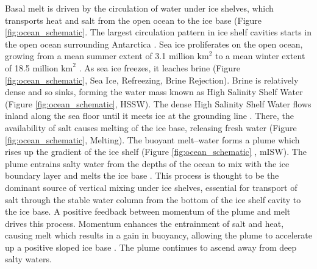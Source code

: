 Basal melt is driven by the circulation of water under ice shelves, which transports heat and salt from the open ocean to the ice base (Figure {\ref{fig:ocean_schematic}}. The largest circulation pattern in ice shelf cavities starts in the open ocean surrounding Antarctica \citep{jacobs1979circulation}. Sea ice proliferates on the open ocean, growing from a mean summer extent of 3.1 million $\mathrm{km}^2$ to a mean winter extent of 18.5 million $\mathrm{km}^2$  \citep{hobbs2016review}. As sea ice freezes, it leaches brine (Figure {\ref{fig:ocean_schematic}}, Sea Ice, Refreezing, Brine Rejection). Brine is relatively dense and so sinks, forming the water mass known as High Salinity Shelf Water (Figure {\ref{fig:ocean_schematic}}, HSSW). The dense High Salinity Shelf Water flows inland along the sea floor until it meets ice at the grounding line \citep{jacobs1979circulation}. There, the availability of salt causes melting of the ice base, releasing fresh water (Figure {\ref{fig:ocean_schematic}}, Melting). The buoyant melt--water forms a plume which rises up the gradient of the ice shelf (Figure {\ref{fig:ocean_schematic}
}, mISW). The plume entrains salty water from the depths of the ocean to mix with the ice boundary layer and melts the ice base \citep{jacobs1979circulation}. 
This process is thought to be the dominant source of vertical mixing under ice shelves, essential for transport of salt through the stable water column from the bottom of the ice shelf cavity to the ice base.  
A positive feedback between momentum of the plume and melt drives this process. Momentum enhances the entrainment of salt and heat, causing melt which results in a gain in buoyancy, allowing the plume to accelerate up a positive sloped ice base  \citep{jenkins1991one}.  The plume continues to ascend away from deep salty waters. 

